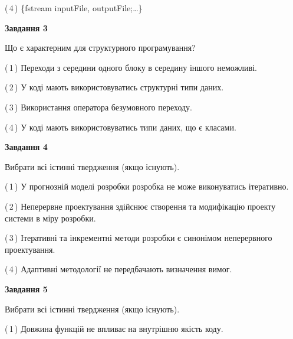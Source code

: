 \documentclass[10pt, ukrainian]{article}
\begin{document}
{\begin {large}
(\,4\,) \{fstream inputFile, outputFile;…\} %


{\begin {center}\textbf{Завдання 3}\end {center}}\par
Що є характерним для структурного програмування?\par
\vspace{2mm}



(\,1\,) Переходи з середини одного блоку в середину іншого неможливі. %



(\,2\,) У коді мають використовуватись структурні типи даних. %



(\,3\,) Використання оператора безумовного переходу. %



(\,4\,) У коді мають використовуватись типи даних, що є класами. %


{\begin {center}\textbf{Завдання 4}\end {center}}\par
Вибрати всі істинні твердження (якщо існують).\par
\vspace{2mm}



(\,1\,) У прогнозній моделі розробки розробка не може виконуватись ітеративно. %



(\,2\,) Неперервне проектування здійснює створення та модифікацію проекту системи в міру розробки. %



(\,3\,) Ітеративні та інкрементні методи розробки є синонімом неперервного проектування. %



(\,4\,) Адаптивні методології не передбачають визначення вимог. %


{\begin {center}\textbf{Завдання 5}\end {center}}\par
Вибрати всі істинні твердження (якщо існують).\par
\vspace{2mm}



(\,1\,) Довжина функцій не впливає на внутрішню якість коду. %




\end{large}}
\end{document}
